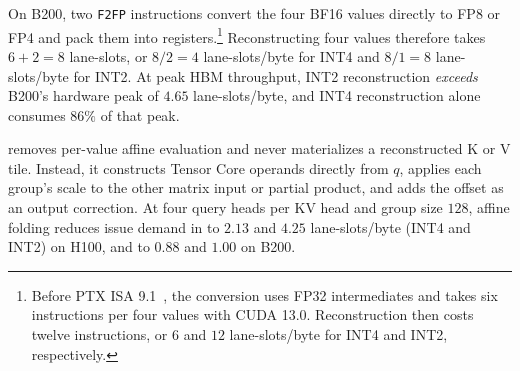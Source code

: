 On B200, two \texttt{F2FP} instructions convert the four BF16 values directly to FP8 or FP4 and pack them into registers.\footnote{Before PTX ISA 9.1~\cite{nvidia2026ptx}, the conversion uses FP32 intermediates and takes six instructions per four values with CUDA 13.0.
Reconstruction then costs twelve instructions, or $6$ and $12$ lane-slots/byte for INT4 and INT2, respectively.}
Reconstructing four values therefore takes $6+2=8$ lane-slots, or $8/2=4$ lane-slots/byte for INT4 and $8/1=8$ lane-slots/byte for INT2.
At peak HBM throughput, INT2 reconstruction \emph{exceeds} B200's hardware peak of $4.65$ lane-slots/byte, and INT4 reconstruction alone consumes $86\%$ of that peak.

\sys{} removes per-value affine evaluation and never materializes a reconstructed K or V tile.
Instead, it constructs Tensor Core operands directly from $q$, applies each group's scale to the other matrix input or partial product, and adds the offset as an output correction.
At four query heads per KV head and group size $128$, affine folding reduces issue demand in  to $2.13$ and $4.25$ lane-slots/byte (INT4 and INT2) on H100, and to $0.88$ and $1.00$ on B200.
